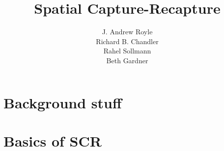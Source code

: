 \documentclass{book}
\begin{document}
\title{ Spatial Capture-Recapture  }
\subtitle{
}
\author{J. Andrew Royle \\
Richard B. Chandler \\
Rahel Sollmann \\
Beth Gardner}


\address{
USGS Patuxent Wildlife Research Center \\
North Carolina State University
}

\maketitle

\newpage

\setcounter{tocdepth}{1}
\tableofcontents

\part{Background stuff}









\part{Basics of SCR}








\end{document}
